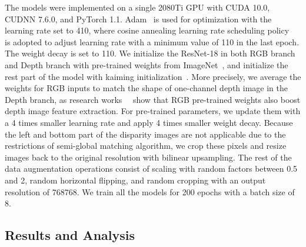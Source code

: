\documentclass[letterpaper, 10 pt, journal, twoside]{ieeetran}
\begin{document}
The models were implemented on a single 2080Ti GPU with CUDA 10.0, CUDNN 7.6.0, and PyTorch 1.1. Adam~\cite{kingma2014adam} is used for optimization with the learning rate set to 410, where cosine annealing learning rate scheduling policy~\cite{loshchilov2016sgdr} is adopted to adjust learning rate with a minimum value of 110 in the last epoch. The weight decay is set to 110. We initialize the ResNet-18 in both RGB branch and Depth branch with pre-trained weights from ImageNet~\cite{russakovsky2015imagenet}, and initialize the rest part of the model with kaiming initialization~\cite{he2015delving}. More precisely, we average the weights for RGB inputs to match the shape of one-channel depth image in the Depth branch, as research works~\cite{hu2019acnet}~\cite{schneider2017multimodal} show that RGB pre-trained weights also boost depth image feature extraction. For pre-trained parameters, we update them with a 4 times smaller learning rate and apply 4 times smaller weight decay. Because the left and bottom part of the disparity images are not applicable due to the restrictions of semi-global matching algorithm, we crop these pixels and resize images back to the original resolution with bilinear upsampling. The rest of the data augmentation operations consist of scaling with random factors between 0.5 and 2, random horizontal flipping, and random cropping with an output resolution of 768768. We train all the models for 200 epochs with a batch size of 8.


\subsection{Results and Analysis}
\end{document}
